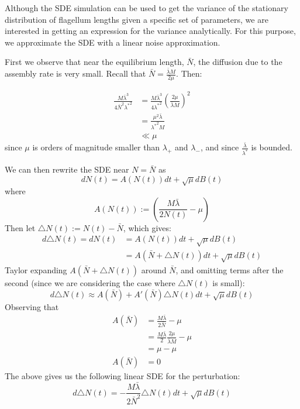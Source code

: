 \documentclass[titlepage]{article}
\begin{document}
Although the SDE simulation can be used to get the variance of the stationary distribution of flagellum lengths given a specific set of parameters, we are interested in getting an expression for the variance analytically.
For this purpose, we approximate the SDE with a linear noise approximation.

First we observe that near the equilibrium length, $\bar{N}$, the diffusion due to the assembly rate is very small.
Recall that $\bar{N}=\frac{\bar\lambda M}{2\mu}$.
Then:

\begin{align*}
\frac{M \bar{\lambda}^3}{4\bar{N}^2{\lambda^*}^2}
&= \frac{M \bar{\lambda}^3}{4{\lambda^*}^2}\left(\frac{2\mu}{\bar\lambda M}\right)^2 \\
&= \frac{\mu^2 \bar\lambda}{{\lambda^*}^2 M} \\
&\ll \mu
\end{align*}
since $\mu$ is orders of magnitude smaller than $\lambda_+$ and $\lambda_-$, and since $\frac{\bar\lambda}{\lambda^*}$ is bounded.

We can then rewrite the SDE near $N = \bar{N}$ as
\begin{equation*}
dN(t)=A(N(t))dt+\sqrt{\mu}dB(t)
\end{equation*}
where
\begin{equation*}
A(N(t)) := \left( \frac{M\bar{\lambda}}{2N(t)} - \mu \right)
\end{equation*}
Then let $\triangle N(t) := N(t)-\bar{N}$, which gives:
\begin{align*}
d \triangle N(t) = dN(t)
&= A(N(t))dt + \sqrt{\mu}dB(t) \\
&= A(\bar{N} + \triangle N(t))dt + \sqrt{\mu}dB(t)
\end{align*}
Taylor expanding $A(\bar{N} + \triangle N(t))$ around $\bar{N}$, and omitting terms after the second (since we are considering the case where $\triangle N(t)$ is small):
\begin{equation*}
d \triangle N(t) \approx
A(\bar{N}) + A'(\bar{N}) \triangle N(t)dt +  \sqrt{\mu}dB(t)
\end{equation*}
Observing that
\begin{align*}
A(\bar{N})
&= \frac{M\bar{\lambda}}{2\bar{N}} - \mu \\
&= \frac{M\bar{\lambda}}{2} \frac{2\mu}{\bar\lambda M} - \mu \\
&= \mu - \mu \\
A(\bar{N}) &= 0
\end{align*}
The above gives us the following linear SDE for the perturbation:
\begin{equation*}
d \triangle N(t) =
-\frac{M\bar\lambda}{2\bar{N}^2} \triangle N(t)dt + \sqrt{\mu}dB(t)
\end{equation*}
\end{document}
